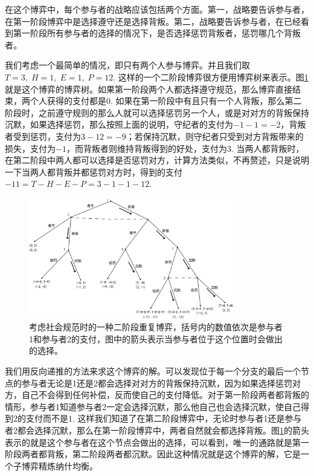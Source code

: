 \documentclass[lang=cn,11pt]{elegantpaper}
\begin{document}
在这个博弈中，每个参与者的战略应该包括两个方面。第一，战略要告诉参与者，在第一阶段博弈中是选择遵守还是选择背叛。第二，战略要告诉参与者，在已经看到第一阶段所有参与者的选择的情况下，是否选择惩罚背叛者，惩罚哪几个背叛者。

我们考虑一个最简单的情况，即只有两个人参与博弈。并且我们取$T=3,\;H=1,\;E=1,\;P=12$. 这样的一个二阶段博弈很方便用博弈树来表示。图\ref{fig:game_tree}就是这个博弈的博弈树。如果第一阶段两个人都选择遵守规范，那么博弈直接结束，两个人获得的支付都是$0$. 如果在第一阶段中有且只有一个人背叛，那么第二阶段时，之前遵守规则的那么人就可以选择惩罚另一个人，或是对对方的背叛保持沉默，如果选择惩罚，那么按照上面的说明，守纪者的支付为$-1-1=-2$，背叛者受到惩罚，支付为$3-12=-9$；若保持沉默，则守纪者只受到对方背叛带来的损失，支付为$-1$，而背叛者则维持背叛得到的好处，支付为$3$. 当两人都背叛时，在第二阶段中两人都可以选择是否惩罚对方，计算方法类似，不再赘述，只是说明一下当两人都背叛并都惩罚对方时，得到的支付$-11=T-H-E-P=3-1-1-12$.
\begin{figure}[htb]
	\centering
	\includegraphics[width=0.8\textwidth]{figure/game_tree.png}
	\caption{考虑社会规范时的一种二阶段重复博弈，括号内的数值依次是参与者1和参与者2的支付，图中的箭头表示当参与者位于这个位置时会做出的选择。 \label{fig:game_tree}}
\end{figure}

我们用反向递推的方法来求这个博弈的解。可以发现位于每一个分支的最后一个节点的参与者无论是1还是2都会选择对对方的背叛保持沉默，因为如果选择惩罚对方，自己不会得到任何补偿，反而使自己的支付降低。对于第一阶段两者都背叛的情形，参与者1知道参与者2一定会选择沉默，那么他自己也会选择沉默，使自己得到$2$的支付而不是$1$. 这样我们知道了在第二阶段博弈中，无论时参与者1还是参与者2都会选择沉默，那么在第一阶段博弈中，两者自然就会都选择背叛。图\ref{fig:game_tree}的箭头表示的就是这个参与者在这个节点会做出的选择，可以看到，唯一的通路就是第一阶段两者都背叛，第二阶段两者都沉默。因此这种情况就是这个博弈的解，它是一个子博弈精炼纳什均衡。
\end{document}
